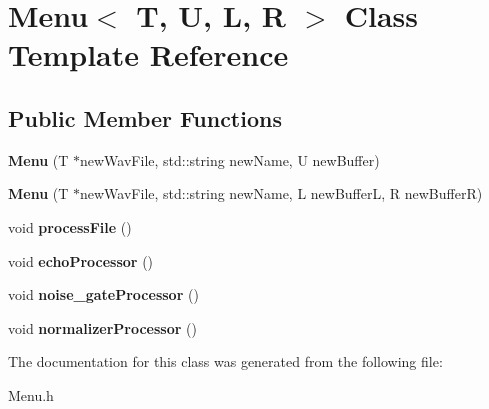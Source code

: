 \hypertarget{classMenu}{}\section{Menu$<$ T, U, L, R $>$ Class Template Reference}
\label{classMenu}
\subsection*{Public Member Functions}
\begin{DoxyCompactItemize}
\item 
\mbox{\label{classMenu_a989630032dba4a44ffc117504f05cb7f}} 
{\bfseries Menu} (T $\ast$new\+Wav\+File, std\+::string new\+Name, U new\+Buffer)
\item 
\mbox{\label{classMenu_ab19ac13956fdbf5433328fc876895a16}} 
{\bfseries Menu} (T $\ast$new\+Wav\+File, std\+::string new\+Name, L new\+BufferL, R new\+BufferR)
\item 
\mbox{\label{classMenu_a767c453057236ad9a1b84008e2ea8ba1}} 
void {\bfseries process\+File} ()
\item 
\mbox{\label{classMenu_a5c6ba6b3454cf5484f967f0458770dc0}} 
void {\bfseries echo\+Processor} ()
\item 
\mbox{\label{classMenu_af9a32c7ca2b5bf30dcda0ea2b529d93b}} 
void {\bfseries noise\+\_\+gate\+Processor} ()
\item 
\mbox{\label{classMenu_a0cacb580f8b1f8d4303727314cec5c69}} 
void {\bfseries normalizer\+Processor} ()
\end{DoxyCompactItemize}


The documentation for this class was generated from the following file\+:\begin{DoxyCompactItemize}
\item 
Menu.\+h\end{DoxyCompactItemize}

